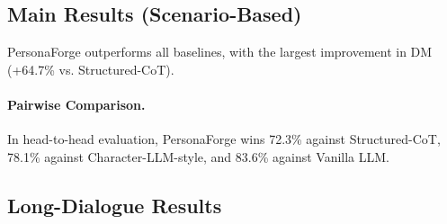 \documentclass[11pt]{article}
\begin{document}
\begin{CJK*}{UTF8}{gbsn}
\subsection{Main Results (Scenario-Based)}

\begin{table}[t]
\centering
\small
{}
\caption{Main results. PC=LLM-as-Judge score. $\pm$=95\% CI. All vs. S-CoT: $p<0.01$.}
\label{tab:main}
\end{table}

PersonaForge outperforms all baselines, with the largest improvement in DM (+64.7\% vs. Structured-CoT).

\paragraph{Pairwise Comparison.} In head-to-head evaluation, PersonaForge wins 72.3\% against Structured-CoT, 78.1\% against Character-LLM-style, and 83.6\% against Vanilla LLM.

\subsection{Long-Dialogue Results}


\end{CJK*}
\end{document}
